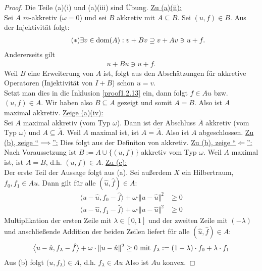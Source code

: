 \begin{proof}
Die Teile (a)(i) und (a)(iii) sind Übung.\nl
\underline{Zu (a)(ii):}\\
Sei $A$ $m$-akkretiv ($\omega=0$) und sei $B$ akkretiv mit $A\subseteq B$. Sei $(u,f)\in B$. Aus der Injektivität folgt:
\begin{align}\label{proof1.2.13}\tag{$\ast$}
\exists v\in\dom(A):v+Bv\supseteq v+Av\ni u+f.
\end{align}
Andererseits gilt
\begin{align*}
u+Bu\ni u+f.
\end{align*}
Weil $B$ eine Erweiterung von $A$ ist, folgt aus den Abschätzungen für akkretive Operatoren (Injektivität von $I+B$) schon $u=v$.\\
Setzt man dies in die Inklusion \eqref{proof1.2.13} ein, dann folgt $f\in Au$ bzw. $(u,f)\in A$. Wir haben also $B\subseteq A$ gezeigt und somit $A=B$. Also ist $A$ maximal akkretiv.\nl
\underline{Zeige (a)(iv):}\\
Sei $A$ maximal akkretiv (vom Typ $\omega$). Dann ist der Abschluss $\overline{A}$ akkretiv (vom Typ $\omega$) und $A\subseteq\overline{A}$. Weil $A$ maximal ist, ist $A=\overline{A}$. Also ist $A$ abgeschlossen.\nl
\underline{Zu (b), zeige ``$\implies$'':}
Dies folgt aus der Definiton von akkretiv.\nl
\underline{Zu (b), zeige ``$\Longleftarrow$'':}\\
Nach Voraussetzung ist $B:=A\cup\big\lbrace(u,f)\big\rbrace$ akkretiv vom Typ $\omega$. Weil $A$ maximal ist, ist $A=B$, d.h. $(u,f)\in A$.\nl
\underline{Zu (c):}\\
Der erste Teil der Aussage folgt aus (a). Sei außerdem $X$ ein Hilbertraum, $f_0,f_1\in Au$. Dann gilt für alle $(\hat{u},\hat{f})\in A$:
\begin{align*}
\big\langle u-\hat{u},f_0-\hat{f}\big\rangle+\omega\cdot\Vert u-\hat{u}\Vert^2&\geq0\\
\big\langle u-\hat{u},f_1-\hat{f}\big\rangle+\omega\cdot\Vert u-\hat{u}\Vert^2&\geq0
\end{align*}
Multiplikation der ersten Zeile mit $\lambda\in[0,1]$ und der zweiten Zeile mit $(-\lambda)$ und anschließende Addition der beiden Zeilen liefert für alle $(\hat{u},\hat{f})\in A:$
\begin{align*}
\big\langle u-\hat{u},f_\lambda-\hat{f}\big\rangle +\omega\cdot\Vert u-\hat{u}\Vert^2\geq0\mit f_\lambda:=(1-\lambda)\cdot f_0+\lambda\cdot f_1
\end{align*}
Aus (b) folgt $\big(u,f_{\lambda}\big)\in A$, d.h. $f_\lambda\in Au$ Also ist $Au$ konvex.
\end{proof}

